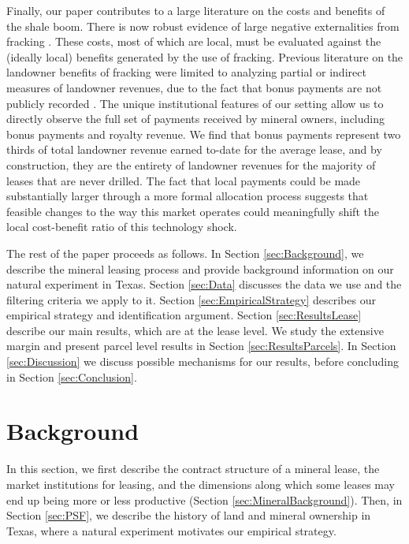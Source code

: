 Finally, our paper contributes to a large literature on the costs and benefits of the shale boom. There is now robust evidence of large negative externalities from fracking \citep{muehlenbachs_housing_2015,currie_hydraulic_2017}. These costs, most of which are local, must be evaluated against the (ideally local) benefits generated by the use of fracking. Previous literature on the landowner benefits of fracking were limited to analyzing partial or indirect measures of landowner revenues, due to the fact that bonus payments are not publicly recorded \citep{brown_capturing_2016,feyrer_geographic_2017,bartik_local_2017}. The unique institutional features of our setting allow us to directly observe the full set of payments received by mineral owners, including bonus payments and royalty revenue. We find that bonus payments represent two thirds of total landowner revenue earned to-date for the average lease, and by construction, they are the entirety of landowner revenues for the majority of leases that are never drilled. The fact that local payments could be made substantially larger through a more formal allocation process suggests that feasible changes to the way this market operates could meaningfully shift the local cost-benefit ratio of this technology shock.

The rest of the paper proceeds as follows. In Section \ref{sec:Background}, we describe the mineral leasing process and provide background information on our natural experiment in Texas. Section \ref{sec:Data} discusses the data we use and the filtering criteria we apply to it.  Section \ref{sec:EmpiricalStrategy} describes our empirical strategy and identification argument. Section \ref{sec:ResultsLease} describe our main results, which are at the lease level. We study the extensive margin and present parcel level results in Section \ref{sec:ResultsParcels}. In Section \ref{sec:Discussion} we discuss possible mechanisms for our results, before concluding in Section \ref{sec:Conclusion}. 

\section{Background \label{sec:Background}}
In this section, we first describe the contract structure of a mineral lease, the market institutions for leasing, and the dimensions along which some leases may end up being more or less productive (Section \ref{sec:MineralBackground}). Then, in Section \ref{sec:PSF}, we describe the history of land and mineral ownership in Texas, where a natural experiment motivates our empirical strategy.

